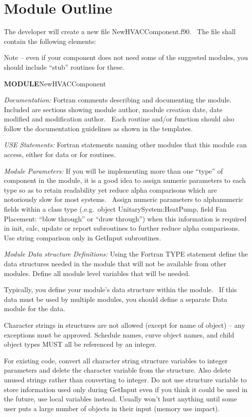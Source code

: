 \section{Module Outline}\label{module-outline}

The developer will create a new file NewHVACComponent.f90.~ The file shall contain the following elements:

Note -- even if your component does not need some of the suggested modules, you should include ``stub'' routines for these.

\textbf{MODULE}NewHVACComponent

\emph{Documentation:} Fortran comments describing and documenting the module. Included are sections showing module author, module creation date, date modified and modification author.~ Each routine and/or function should also follow the documentation guidelines as shown in the templates.

\emph{USE Statements:} Fortran statements naming other modules that this module can access, either for data or for routines.

\emph{Module Parameters:} If you will be implementing more than one ``type'' of component in the module, it is a good idea to assign numeric parameters to each type so as to retain readability yet reduce alpha comparisons which are notoriously slow for most systems.~ Assign numeric parameters to alphanumeric fields within a class type (.e.g.~object UnitarySystem:HeatPump, field Fan Placement: ``blow through'' or ``draw through'') when this information is required in init, calc, update or report subroutines to further reduce alpha comparisons.~ Use string comparison only in GetInput subroutines.

\emph{Module Data structure Definitions:} Using the Fortran TYPE statement define the data structures needed in the module that will not be available from other modules. Define all module level variables that will be needed.

Typically, you define your module's data structure within the module.~ If this data must be used by multiple modules, you should define a separate Data module for the data.

Character strings in structures are not allowed (except for name of object) -- any exceptions must be approved. Schedule names, curve object names, and child object types MUST all be referenced by an integer.

For existing code, convert all character string structure variables to integer parameters and delete the character variable from the structure. Also delete unused strings rather than converting to integer. Do not use structure variable to store information used only during GetInput even if you think it could be used in the future, use local variables instead. Usually won't hurt anything until some user puts a large number of objects in their input (memory use impact).

